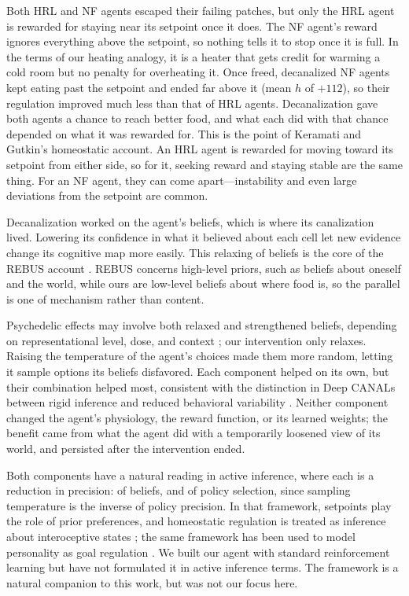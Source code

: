 \documentclass[12pt,fleqn]{article}
\begin{document}
Both HRL and NF agents escaped their failing patches, but only the HRL agent is rewarded for staying near its setpoint once it does. The NF agent's reward ignores everything above the setpoint, so nothing tells it to stop once it is full. In the terms of our heating analogy, it is a heater that gets credit for warming a cold room but no penalty for overheating it. Once freed, decanalized NF agents kept eating past the setpoint and ended far above it (mean $h$ of $+112$), so their regulation improved much less than that of HRL agents. Decanalization gave both agents a chance to reach better food, and what each did with that chance depended on what it was rewarded for. This is the point of Keramati and Gutkin's \citeyearpar{keramati_homeostatic_2014} homeostatic account. An HRL agent is rewarded for moving toward its setpoint from either side, so for it, seeking reward and staying stable are the same thing. For an NF agent, they can come apart---instability and even large deviations from the setpoint are common.

Decanalization worked on the agent's beliefs, which is where its canalization lived. Lowering its confidence in what it believed about each cell let new evidence change its cognitive map more easily. This relaxing of beliefs is the core of the REBUS account \citep{carhart-harris_rebus_2019}. REBUS concerns high-level priors, such as beliefs about oneself and the world, while ours are low-level beliefs about where food is, so the parallel is one of mechanism rather than content.

Psychedelic effects may involve both relaxed and strengthened beliefs, depending on representational level, dose, and context \citep{safron_albus_2025}; our intervention only relaxes. Raising the temperature of the agent's choices made them more random, letting it sample options its beliefs disfavored. Each component helped on its own, but their combination helped most, consistent with the distinction in Deep CANALs between rigid inference and reduced behavioral variability \citep{juliani_deep_2024}. Neither component changed the agent's physiology, the reward function, or its learned weights; the benefit came from what the agent did with a temporarily loosened view of its world, and persisted after the intervention ended.

Both components have a natural reading in active inference, where each is a reduction in precision: of beliefs, and of policy selection, since sampling temperature is the inverse of policy precision. In that framework, setpoints play the role of prior preferences, and homeostatic regulation is treated as inference about interoceptive states \citep{pezzulo_active_2015}; the same framework has been used to model personality as goal regulation \citep{safron_sheikhbahaee_2024}. We built our agent with standard reinforcement learning but have not formulated it in active inference terms. The framework is a natural companion to this work, but was not our focus here.
\end{document}
